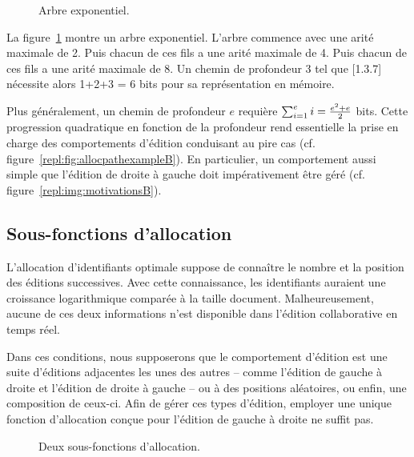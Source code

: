 \begin{figure}
  \begin{center}
    
    \caption[Arbre exponentiel]
    {\label{repl:fig:exponentialtree}Arbre exponentiel.}
  \end{center}
\end{figure}

La figure~\ref{repl:fig:exponentialtree} montre un arbre exponentiel. L'arbre
commence avec une arité maximale de 2. Puis chacun de ces fils a une arité
maximale de 4. Puis chacun de ces fils a une arité maximale de 8. Un chemin de
profondeur 3 tel que [1.3.7] nécessite alors 1+2+3 = 6 bits pour sa
représentation en mémoire.

Plus généralement, un chemin de profondeur $e$ requière
$\textstyle\sum\nolimits_{i=1}^{e}i = {e^2 + e \over{2}}$ bits. Cette progression
quadratique en fonction de la profondeur rend essentielle la prise en charge des
comportements d'édition conduisant au pire cas
(cf. figure~\ref{repl:fig:allocpathexampleB}). En particulier, un comportement
aussi simple que l'édition de droite à gauche doit impérativement être géré
(cf. figure~\ref{repl:img:motivationsB}).

\subsection{Sous-fonctions d'allocation}
\label{repl:subsec:suballocation}

L'allocation d'identifiants optimale suppose de connaître le nombre et la
position des éditions successives. Avec cette connaissance, les identifiants
auraient une croissance logarithmique comparée à la taille
document. Malheureusement, aucune de ces deux informations n'est disponible dans
l'édition collaborative en temps réel.

Dans ces conditions, nous supposerons que le comportement d'édition est une
suite d'éditions adjacentes les unes des autres -- comme l'édition de gauche à
droite et l'édition de droite à gauche -- ou à des positions aléatoires, ou
enfin, une composition de ceux-ci. Afin de gérer ces types d'édition, employer
une unique fonction d'allocation conçue pour l'édition de gauche à droite ne
suffit pas.

\begin{figure}
  \begin{center}
    \hspace{20pt}
    \caption[Deux sous-fonctions d'allocation]
    {\label{repl:fig:suballocation}Deux sous-fonctions d'allocation.}
  \end{center}
\end{figure}

